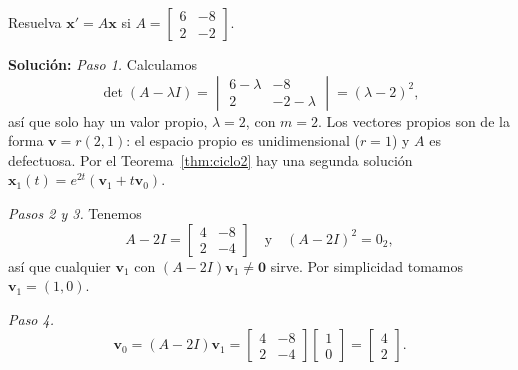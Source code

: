 \begin{example}\label{ex:nodo2}
Resuelva $\mathbf{x}' = A\mathbf{x}$ si $A = \begin{bmatrix} 6 & -8 \\ 2 & -2 \end{bmatrix}$.

\noindent \textbf{Soluci\'on:} \emph{Paso 1.} Calculamos
\[
\det(A - \lambda I) = \begin{vmatrix} 6-\lambda & -8 \\ 2 & -2-\lambda \end{vmatrix} = (\lambda - 2)^2,
\]
as\'i que solo hay un valor propio, $\lambda = 2$, con $m=2$. Los vectores propios son de la forma $\mathbf{v} = r(2, 1)$: el espacio propio es unidimensional ($r=1$) y $A$ es defectuosa. Por el Teorema~\ref{thm:ciclo2} hay una segunda soluci\'on $\mathbf x_1(t)=e^{2t}(\mathbf v_1+t\mathbf v_0)$.

\emph{Pasos 2 y 3.} Tenemos
\[
A - 2I = \begin{bmatrix} 4 & -8 \\ 2 & -4 \end{bmatrix} \quad \text{y} \quad (A - 2I)^2 = 0_2,
\]
as\'i que cualquier $\mathbf v_1$ con $(A-2I)\mathbf v_1\neq\mathbf 0$ sirve. Por simplicidad tomamos $\mathbf{v}_1 = (1, 0)$.

\emph{Paso 4.}
\[
\mathbf{v}_0 = (A-2I)\mathbf v_1=\begin{bmatrix} 4 & -8 \\ 2 & -4 \end{bmatrix} \begin{bmatrix} 1 \\ 0 \end{bmatrix} = \begin{bmatrix} 4 \\ 2 \end{bmatrix}.
\]


\end{example}
